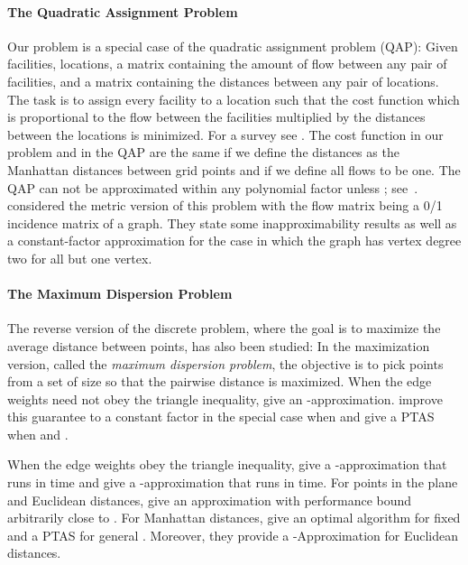\documentclass[preprint,authoryear,12pt]{elsarticle}
\begin{document}
\paragraph{The Quadratic Assignment Problem}
Our problem is a special case of the quadratic assignment problem
(QAP): Given  facilities,  locations, a matrix containing the
amount of flow between any pair of facilities, and a matrix
containing the distances between any pair of locations. The task is
to assign every facility to a location such that the cost function
which is proportional to the flow between the facilities multiplied
by the distances between the locations is minimized. For a survey
see \cite{loiola07}. The cost function in our problem and in the
QAP are the same if we define the distances as the Manhattan
distances between grid points and if we define all flows to be one.
The QAP can not be approximated within any polynomial factor unless
; see~\cite{sahni76}.
\cite{hls-amqap-09}
considered the metric version of this problem with the flow matrix
being a 0/1 incidence matrix of a graph. They state some
inapproximability results as well as a constant-factor approximation
for the case in which the graph has vertex degree two for all but
one vertex.


\paragraph{The Maximum Dispersion Problem}
The reverse version of the discrete problem, where the goal is to
maximize the average distance between points, has also been studied:
In the maximization version, called the \emph{maximum dispersion
problem}, the objective is to pick  points from a set of size 
so that the pairwise distance is maximized. When the edge weights
need not obey the triangle inequality, \cite{kp-cds-93} give an -approximation. \cite{aitt-gfds-00} improve this guarantee to a constant factor in
the special case when  and \cite{akk-ptasd-99} give a PTAS when  and
.

When the edge weights obey the triangle inequality, \cite{rrt-hscad-94} give a -approximation that runs in 
time and \cite{hrt-aamd-97} give a -approximation that runs in
 time. For points in the plane and Euclidean
distances, \cite{rrt-hscad-94} give an approximation with performance bound
arbitrarily close to . For Manhattan distances,
\cite{fm-mdgmwc-04} give an optimal algorithm for fixed  and a
PTAS for general . Moreover, they provide a
-Approximation for Euclidean distances.
\end{document}

